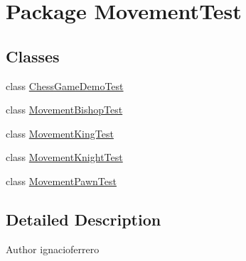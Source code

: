 \hypertarget{namespace_movement_test}{\section{Package Movement\-Test}
\label{namespace_movement_test}
}
\subsection*{Classes}
\begin{DoxyCompactItemize}
\item 
class \hyperlink{class_movement_test_1_1_chess_game_demo_test}{Chess\-Game\-Demo\-Test}
\item 
class \hyperlink{class_movement_test_1_1_movement_bishop_test}{Movement\-Bishop\-Test}
\item 
class \hyperlink{class_movement_test_1_1_movement_king_test}{Movement\-King\-Test}
\item 
class \hyperlink{class_movement_test_1_1_movement_knight_test}{Movement\-Knight\-Test}
\item 
class \hyperlink{class_movement_test_1_1_movement_pawn_test}{Movement\-Pawn\-Test}
\end{DoxyCompactItemize}


\subsection{Detailed Description}
\begin{DoxyAuthor}{Author}
ignacioferrero 
\end{DoxyAuthor}
